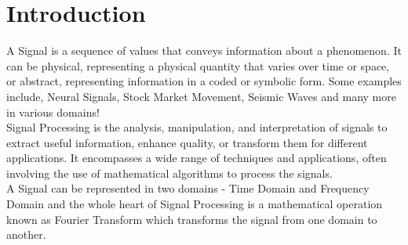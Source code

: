 \documentclass[oneside]{book}
\begin{document}

\newpage
\tableofcontents
\newpage
\Large

\chapter{Introduction} \label{Chapter-1}
A Signal is a sequence of values that conveys information about a phenomenon.
It can be physical, representing a physical quantity that varies over time or
space, or abstract, representing information in a coded or symbolic form. Some
examples include, Neural Signals, Stock Market Movement, Seismic Waves and
many more in various domains! \\
\bigskip
Signal Processing is the analysis, manipulation, and interpretation of signals to
extract useful information, enhance quality, or transform them for different
applications. It encompasses a wide range of techniques and applications, often
involving the use of mathematical algorithms to process the signals.\\
\bigskip
A Signal can be represented in two domains - Time Domain and Frequency
Domain and the whole heart of Signal Processing is a mathematical operation
known as Fourier Transform which transforms the signal from one domain to
another.

\newpage
\end{document}
